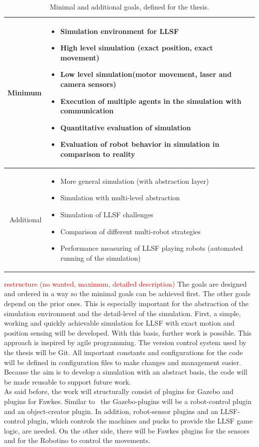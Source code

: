\documentclass[11pt,a4paper]{article}
\begin{document}
\begin{table}
\begin{tabular}{|r||p{10cm}|}
\hline
Minimum & \begin{itemize}
\item Simulation environment for LLSF
\item High level simulation (exact position, exact movement)
\item Low level simulation(motor movement, laser and camera sensors)
\item Execution of multiple agents in the simulation with communication
\item Quantitative evaluation of simulation
\item Evaluation of robot behavior in simulation in comparison to reality
\end{itemize}\\ \hline
Additional & \begin{itemize}
\item More general simulation (with abstraction layer)
\item Simulation with multi-level abstraction
\item Simulation of LLSF challenges
\item Comparison of different multi-robot strategies
\item Performance measuring of LLSF playing robots (automated running of the simulation)
\end{itemize}\\
\hline
\end{tabular}
\label{Table 1}
\caption{Minimal and additional goals, defined for the thesis.}
\end{table}
\textcolor{red}{restructure (no wanted, maximum, detailed description)}
The goals are designed and ordered in a way so the minimal goals can be achieved first. The other goals depend on the prior ones. This is especially important for the abstraction of the simulation environment and the detail-level of the simulation. First, a simple, working and quickly achievable simulation for LLSF with exact motion and position sensing will be developed. With this basis, further work is possible. This approach is inspired by agile programming. The version control system used by the thesis will be Git. All important constants and configurations for the code will be defined in configuration files to make changes and management easier. Because the aim is to develop a simulation with an abstract basis, the code will be made reusable to support future work.\\
As said before, the work will structurally consist of plugins for Gazebo and plugins for Fawkes. Similar to~\cite{KlingenDA} the Gazebo-plugins will be a robot-control plugin and an object-creator plugin. In addition, robot-sensor plugins and an LLSF-control plugin, which controls the machines and pucks to provide the LLSF game logic,  are needed. On the other side, there will be Fawkes plugins  for the sensors and for the Robotino to control the movements.
\end{document}
